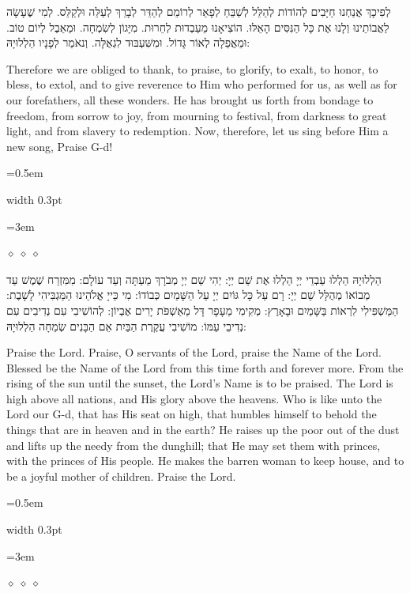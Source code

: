 \documentclass[11pt, openany]{book}
\newlength{\bidiHebWidth}
\newlength{\bidiEngWidth}
\newenvironment{bilingual}{%
  \par\vspace{4pt}%
}{%
  \noindent
  \begin{minipage}[t]{\bidiEngWidth}
    \setstretch{1.4}\emergencystretch=0.5em\normalsize
    \usebox{\bidiEngBox}
  \end{minipage}%
  \hfill
  {\color{sedergold}\vrule width 0.3pt}%
  \hfill
  \begin{minipage}[t]{\bidiHebWidth}
    \begingroup\hebrewfont\TeXXeTstate=1\beginR
    \large\setstretch{1.4}\emergencystretch=3em\tolerance=9999\parindent=0pt\relax
    \usebox{\bidiHebBox}
    \endR\endgroup
  \end{minipage}%
  \par\vspace{2pt}%
}
\newenvironment{hebrewcol}{%
  \begin{lrbox}{\bidiHebBox}\begin{minipage}{\bidiHebWidth}%
}{%
  \end{minipage}\end{lrbox}%
}
\newenvironment{englishcol}{%
  \begin{lrbox}{\bidiEngBox}\begin{minipage}{\bidiEngWidth}%
}{%
  \end{minipage}\end{lrbox}%
}
\newcommand{\parasep}{%
  \par\vspace{3pt}
  \begin{center}
    \textcolor{sedergold!50}{\tiny$\diamond\;\diamond\;\diamond$}
  \end{center}
  \par\vspace{3pt}
}
\begin{document}
\begin{bilingual}
\begin{hebrewcol}
לְפִיכָךְ אֲנַחְנוּ חַיָּבִים לְהוֹדוֹת לְהַלֵּל לְשַׁבֵּחַ לְפָאֵר לְרוֹמֵם לְהַדֵּר לְבָרֵךְ לְעַלֵּה וּלְקַלֵּס. לְמִי שֶׁעָשָׂה לַאֲבוֹתֵינוּ וְלָנוּ אֶת כָּל הַנִּסִּים הָאֵלּוּ. הוֹצִיאָנוּ מֵעַבְדוּת לְחֵרוּת. מִיָּגוֹן לְשִׂמְחָה.
וּמֵאֵבֶל לְיוֹם טוֹב. וּמֵאֲפֵלָה לְאוֹר גָּדוֹל. וּמִשִּׁעְבּוּד לִגְאֻלָּה. וְנאֹמַר לְפָנָיו הַלְלוּיָהּ:
\end{hebrewcol}
\begin{englishcol}
Therefore we are obliged to thank, to praise, to glorify, to exalt, to honor, to bless, to extol, and to give reverence to Him who performed for us, as well as for our forefathers, all these wonders. He has brought us forth from bondage to freedom, from sorrow to joy, from mourning to festival, from darkness to great light, and from slavery to redemption. Now, therefore, let us sing before Him a new song, Praise G-d!
\end{englishcol}
\end{bilingual}
\parasep

\begin{bilingual}
\begin{hebrewcol}
הַלְלוּיָהּ הַלְלוּ עַבְדֵי יְיָ הַלְלוּ אֶת שֵׁם יְיָ: יְהִי שֵׁם יְיָ מְבֹרָךְ מֵעַתָּה וְעַד עוֹלָם: מִמִּזְרַח שֶׁמֶשׁ עַד מְבוֹאוֹ מְהֻלָּל שֵׁם יְיָ: רָם עַל כָּל גּוֹיִם יְיָ עַל הַשָּׁמַיִם כְּבוֹדוֹ: מִי כַּייָ אֱלֹהֵינוּ הַמַּגְבִּיהִי לָשָׁבֶת: הַמַּשְׁפִּילִי לִרְאוֹת בַּשָּׁמַיִם וּבָאָרֶץ: מְקִימִי מֵעָפָר דָּל מֵאַשְׁפֹּת יָרִים אֶבְיוֹן: לְהוֹשִׁיבִי עִם נְדִיבִים עִם נְדִיבֵי עַמּוֹ: מוֹשִׁיבִי עֲקֶרֶת הַבַּיִת אֵם הַבָּנִים שְׂמֵחָה הַלְלוּיָהּ:
\end{hebrewcol}
\begin{englishcol}
Praise the Lord. Praise, O servants of the Lord, praise the Name of the Lord. Blessed be the Name of the Lord from this time forth and forever more. From the rising of the sun until the sunset, the Lord's Name is to be praised. The Lord is high above all nations, and His glory above the heavens. Who is like unto the Lord our G-d, that has His seat on high, that humbles himself to behold the things that are in heaven and in the earth? He raises up the poor out of the dust and lifts up the needy from the dunghill; that He may set them with princes, with the princes of His people. He makes the barren woman to keep house, and to be a joyful mother of children. Praise the Lord.
\end{englishcol}
\end{bilingual}
\parasep
\end{document}

